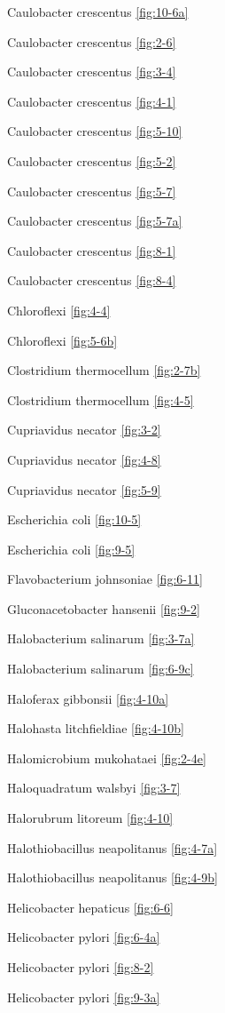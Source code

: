 \documentclass[]{tufte-book}
\begin{document}
Caulobacter crescentus \ref{fig:10-6a}

Caulobacter crescentus \ref{fig:2-6}

Caulobacter crescentus \ref{fig:3-4}

Caulobacter crescentus \ref{fig:4-1}

Caulobacter crescentus \ref{fig:5-10}

Caulobacter crescentus \ref{fig:5-2}

Caulobacter crescentus \ref{fig:5-7}

Caulobacter crescentus \ref{fig:5-7a}

Caulobacter crescentus \ref{fig:8-1}

Caulobacter crescentus \ref{fig:8-4}

Chloroflexi \ref{fig:4-4}

Chloroflexi \ref{fig:5-6b}

Clostridium thermocellum \ref{fig:2-7b}

Clostridium thermocellum \ref{fig:4-5}

Cupriavidus necator \ref{fig:3-2}

Cupriavidus necator \ref{fig:4-8}

Cupriavidus necator \ref{fig:5-9}

Escherichia coli \ref{fig:10-5}

Escherichia coli \ref{fig:9-5}

Flavobacterium johnsoniae \ref{fig:6-11}

Gluconacetobacter hansenii \ref{fig:9-2}

Halobacterium salinarum \ref{fig:3-7a}

Halobacterium salinarum \ref{fig:6-9c}

Haloferax gibbonsii \ref{fig:4-10a}

Halohasta litchfieldiae \ref{fig:4-10b}

Halomicrobium mukohataei \ref{fig:2-4e}

Haloquadratum walsbyi \ref{fig:3-7}

Halorubrum litoreum \ref{fig:4-10}

Halothiobacillus neapolitanus \ref{fig:4-7a}

Halothiobacillus neapolitanus \ref{fig:4-9b}

Helicobacter hepaticus \ref{fig:6-6}

Helicobacter pylori \ref{fig:6-4a}

Helicobacter pylori \ref{fig:8-2}

Helicobacter pylori \ref{fig:9-3a}
\end{document}
